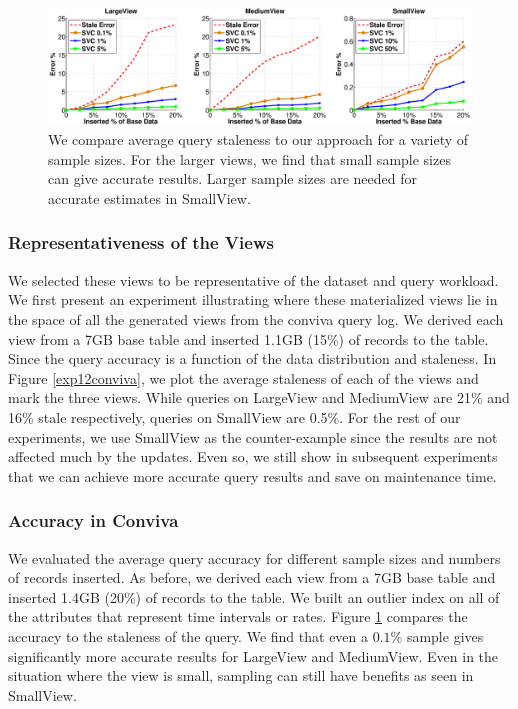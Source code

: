 \begin{figure}[t]
\includegraphics[trim = 45mm 0mm 45mm 0mm, clip,width=\columnwidth]{exp/exp5-coniva-accuracy.eps}\vspace{-.5em}
 \caption{We compare average query staleness to our approach for a variety of sample sizes. For the larger views, we find that small sample sizes can give accurate results. Larger sample sizes are needed for accurate estimates in SmallView. \label{exp5conviva}}\vspace{-.5em}
\end{figure}



\subsubsection{Representativeness of the Views}
We selected these views to be representative of the dataset and query workload. 
We first present an experiment illustrating where these materialized views lie in the space of all the generated views from the conviva query log. 
We derived each view from a 7GB base table and inserted 1.1GB (15\%) of records to the table. 
Since the query accuracy is a function of the data distribution and staleness.
In Figure \ref{exp12conviva}, we plot the average staleness of each of the views and mark the three views.
While queries on LargeView and MediumView are 21\% and 16\% stale respectively, queries on SmallView are 0.5\%.
For the rest of our experiments, we use SmallView as the counter-example since the results are not affected much by the updates.
Even so, we still show in subsequent experiments that we can achieve more accurate query results and save on maintenance time.

\subsubsection{Accuracy in Conviva}
We evaluated the average query accuracy for different sample sizes and numbers of records inserted.
As before, we derived each view from a 7GB base table and inserted 1.4GB (20\%) of records to the table. 
We built an outlier index on all of the attributes that represent time intervals or rates.
Figure \ref{exp5conviva} compares the accuracy to the staleness of the query.
We find that even a $0.1\%$ sample gives significantly more accurate results for LargeView and MediumView.
Even in the situation where the view is small, sampling can still have benefits as seen in SmallView.

